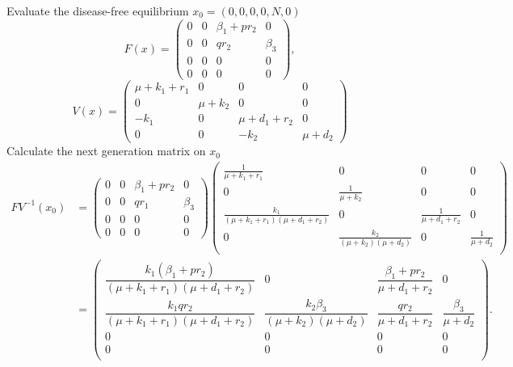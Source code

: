     Evaluate the disease-free equilibrium $x_0 = \left(0, 0, 0, 0, N, 0 \right)$ 
    \begin{equation*}
        F(x) = 
            \begin{pmatrix}
                0 & 0 & \beta_{1} + p r_2 & 0 \\
                0 & 0 &   q r_2  &   \beta_{3} \\
        		0 & 0 & 0 & 0 \\
    		    0 & 0 & 0 & 0
            \end{pmatrix},
    \end{equation*}
    \begin{equation*}
        V(x) =
            \begin{pmatrix}
                \mu + k_1 + r_1 & 0 & 0 & 0 \\
                0 & \mu + k_2 & 0 & 0 \\
                -k_1 & 0 & \mu + d_1 + r_2 & 0 \\
                0 & 0 & -k_2 & \mu + d_2
            \end{pmatrix}
    \end{equation*}
    Calculate the next generation matrix on $x_0$
    \begin{align*}	
    	FV^{-1}(x_0) 
    	&=  
        \begin{pmatrix}
            0 & 0 & \beta_{1} + p r_2 & 0 \\
            0 & 0 &   q r_1  &   \beta_{3} \\
    		0 & 0 & 0 & 0 \\
    	    0 & 0 & 0 & 0
        \end{pmatrix}
    	\begin{pmatrix}
    		\frac{1}{\mu + k_1 + r_1} & 0 & 0 & 0 \\
    		0 & \frac{1}{\mu + k_2} & 0 & 0 \\
    		\frac{k_1}{(\mu + k_1 + r_1)(\mu + d_1 +r_2)} & 0 & \frac{1}{\mu + d_1 +r_2} & 0 \\
    		0 & \frac{k_2}{(\mu + k_2)(\mu + d_2)} & 0 & \frac{1}{\mu + d_2} \\
    	\end{pmatrix}  \\
    	&= 
    	\begin{pmatrix}
    		\dfrac{k_1(\beta_1 + pr_2)}{(\mu + k_1 + r_1)(\mu + d_1 +r_2)} 
            & 0 & \dfrac{\beta_1 + pr_2}{\mu + d_1 +r_2} & 0 
        \\
    		\dfrac{k_1 q r_2}{(\mu + k_1 + r_1)(\mu + d_1 +r_2)} 
    			& \dfrac{k_2 \beta_3}{(\mu + k_2)(\mu + d_2)} 
          & \dfrac{qr_2}{\mu + d_1 +r_2} & \dfrac{\beta_3}{\mu + d_2} 
        \\
    		0 & 0 & 0 & 0 
    		\\
    		0 & 0 & 0 & 0 
    		\\
    	\end{pmatrix}.
    \end{align*}
